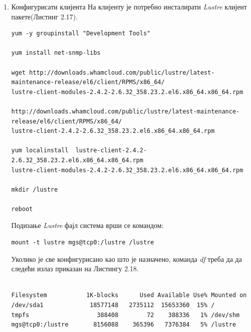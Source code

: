 \begin{enumerate}
\item Конфигурисати клијента 
На клијенту је потребно инсталирати \textit{Lustre} клијент пакете(Листинг 2.17). 
\begin{lstlisting}[style=nonumbers,frame=single, caption= Команде за инсталацију \textit{Lustre} клијент пакета]
yum -y groupinstall "Development Tools"

yum install net-snmp-libs

wget http://downloads.whamcloud.com/public/lustre/latest-maintenance-release/el6/client/RPMS/x86_64/
lustre-client-modules-2.4.2-2.6.32_358.23.2.el6.x86_64.x86_64.rpm

http://downloads.whamcloud.com/public/lustre/latest-maintenance-release/el6/client/RPMS/x86_64/
lustre-client-2.4.2-2.6.32_358.23.2.el6.x86_64.x86_64.rpm

yum localinstall  lustre-client-2.4.2-2.6.32_358.23.2.el6.x86_64.x86_64.rpm 
lustre-client-modules-2.4.2-2.6.32_358.23.2.el6.x86_64.x86_64.rpm 

mkdir /lustre

reboot
\end{lstlisting}


Подизање   \textit{Lustre} фајл система врши се командом:
\begin{verbatim}
mount -t lustre mgs@tcp0:/lustre /lustre
\end{verbatim}

Уколико је све конфигурисано као што је назначено, команда  \textit{df} треба да да следећи излаз приказан на Листингу 2.18.
\begin{lstlisting}[style=nonumbers,frame=single, caption= Излаз команде \textit{df}]

Filesystem           1K-blocks      Used Available Use% Mounted on
/dev/sda1             18577148   2735112  15653360  15% /
tmpfs                   388408        72    388336   1% /dev/shm
mgs@tcp0:/lustre       8156088    365396   7376384   5% /lustre

\end{lstlisting}

\end{enumerate}


